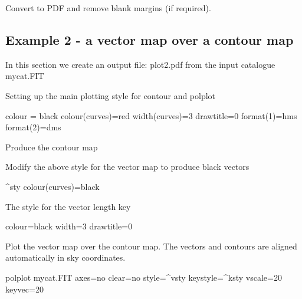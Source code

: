 \begin{terminalv}
\end{terminalv}

Convert to PDF and remove blank margins (if required).

\begin{terminalv}
\end{terminalv}


\subsection{ Example 2 - a vector map over a contour map}
\label{section:kappa-example2}


In this section we create an output file: plot2.pdf from the input catalogue mycat.FIT

\begin{terminalv}
\end{terminalv}

Setting up the main plotting style for contour and polplot

\begin{terminalv}
colour = black
colour(curves)=red
width(curves)=3
drawtitle=0
format(1)=hms
format(2)=dms
\end{terminalv}


Produce the contour map

\begin{terminalv}
\end{terminalv}


Modify the above style for the vector map to produce black vectors

\begin{terminalv}
^sty
colour(curves)=black
\end{terminalv}


The style for the vector length key


\begin{terminalv}
colour=black
width=3
drawtitle=0
\end{terminalv}

Plot the vector map over the contour map. The vectors and
contours are aligned automatically in sky coordinates.


\begin{terminalv}
polplot mycat.FIT axes=no clear=no style=^vsty keystyle=^ksty vscale=20 keyvec=20
\end{terminalv}

